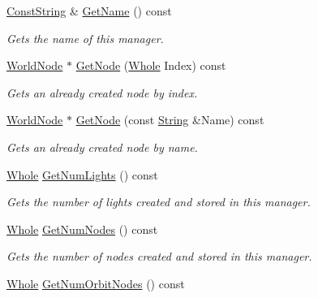 \begin{DoxyCompactItemize}
\hyperlink{namespacephys_a5ce5049f8b4bf88d6413c47b504ebb31}{ConstString} \& \hyperlink{classphys_1_1SceneManager_a3f06260dffe9c70f17934cdfe41bd5a5}{GetName} () const 
\begin{DoxyCompactList}\small\item\em Gets the name of this manager. \item\end{DoxyCompactList}\item 
\hyperlink{classphys_1_1WorldNode}{WorldNode} $\ast$ \hyperlink{classphys_1_1SceneManager_ad7359bdccd992f34fff901b213825db6}{GetNode} (\hyperlink{namespacephys_a460f6bc24c8dd347b05e0366ae34f34a}{Whole} Index) const 
\begin{DoxyCompactList}\small\item\em Gets an already created node by index. \item\end{DoxyCompactList}\item 
\hyperlink{classphys_1_1WorldNode}{WorldNode} $\ast$ \hyperlink{classphys_1_1SceneManager_a30fb2074edc5191826aa2b0fb4d943a6}{GetNode} (const \hyperlink{namespacephys_aa03900411993de7fbfec4789bc1d392e}{String} \&Name) const 
\begin{DoxyCompactList}\small\item\em Gets an already created node by name. \item\end{DoxyCompactList}\item 
\hyperlink{namespacephys_a460f6bc24c8dd347b05e0366ae34f34a}{Whole} \hyperlink{classphys_1_1SceneManager_aa1eaa692e63a6d8e328d2f0e4a2f9bf8}{GetNumLights} () const 
\begin{DoxyCompactList}\small\item\em Gets the number of lights created and stored in this manager. \item\end{DoxyCompactList}\item 
\hyperlink{namespacephys_a460f6bc24c8dd347b05e0366ae34f34a}{Whole} \hyperlink{classphys_1_1SceneManager_a6ba57b9db1a1bfe2471425d6d8341272}{GetNumNodes} () const 
\begin{DoxyCompactList}\small\item\em Gets the number of nodes created and stored in this manager. \item\end{DoxyCompactList}\item 
\hyperlink{namespacephys_a460f6bc24c8dd347b05e0366ae34f34a}{Whole} \hyperlink{classphys_1_1SceneManager_ac54e082885d9df328aab3f8bcfaaaad2}{GetNumOrbitNodes} () const 

\end{DoxyCompactItemize}
